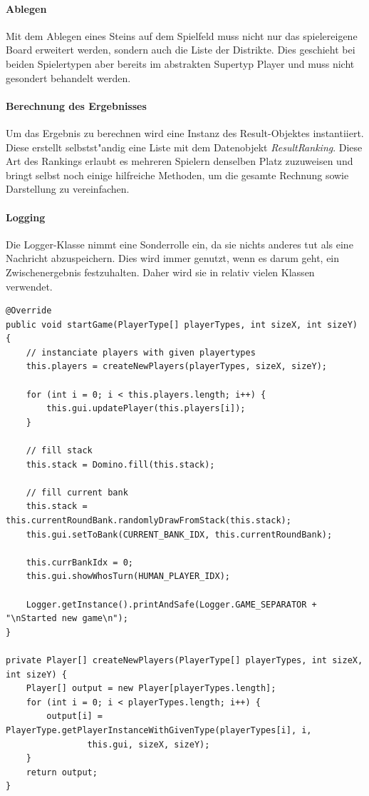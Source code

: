 \paragraph{Ablegen}
Mit dem Ablegen eines Steins auf dem Spielfeld muss nicht nur das spielereigene Board erweitert werden, sondern auch die Liste der Distrikte. Dies geschieht bei beiden Spielertypen aber bereits im abstrakten Supertyp Player und muss nicht gesondert behandelt werden. 

\paragraph{Berechnung des Ergebnisses}
Um das Ergebnis zu berechnen wird eine Instanz des Result-Objektes instantiiert. Diese erstellt selbstst"andig eine Liste mit dem Datenobjekt \emph{ResultRanking}. Diese Art des Rankings erlaubt es mehreren Spielern denselben Platz zuzuweisen und bringt selbst noch einige hilfreiche Methoden, um die gesamte Rechnung sowie Darstellung zu vereinfachen. 

\paragraph{Logging}
Die Logger-Klasse nimmt eine Sonderrolle ein, da sie nichts anderes tut als eine Nachricht abzuspeichern. Dies wird immer genutzt, wenn es darum geht, ein Zwischenergebnis festzuhalten. Daher wird sie in relativ vielen Klassen verwendet. 

\begin{lstlisting}[style=CodeHighlighting,caption=Game - startGame,label=game_startGame]
@Override
public void startGame(PlayerType[] playerTypes, int sizeX, int sizeY) {
    // instanciate players with given playertypes
    this.players = createNewPlayers(playerTypes, sizeX, sizeY);

    for (int i = 0; i < this.players.length; i++) {
        this.gui.updatePlayer(this.players[i]);
    }

    // fill stack
    this.stack = Domino.fill(this.stack);

    // fill current bank
    this.stack = this.currentRoundBank.randomlyDrawFromStack(this.stack);
    this.gui.setToBank(CURRENT_BANK_IDX, this.currentRoundBank);

    this.currBankIdx = 0;
    this.gui.showWhosTurn(HUMAN_PLAYER_IDX);

    Logger.getInstance().printAndSafe(Logger.GAME_SEPARATOR + "\nStarted new game\n");
}

private Player[] createNewPlayers(PlayerType[] playerTypes, int sizeX, int sizeY) {
    Player[] output = new Player[playerTypes.length];
    for (int i = 0; i < playerTypes.length; i++) {
        output[i] = PlayerType.getPlayerInstanceWithGivenType(playerTypes[i], i, 
        		this.gui, sizeX, sizeY);
    }
    return output;
}
\end{lstlisting}